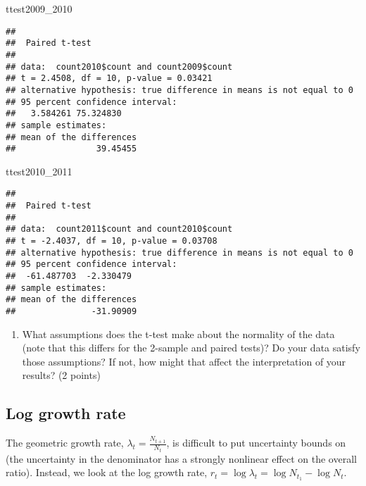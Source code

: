 \documentclass[
]{article}
\newenvironment{Shaded}{\begin{snugshade}}{\end{snugshade}}
\newcommand{\DecValTok}[1]{\textcolor[rgb]{0.00,0.00,0.81}{#1}}
\newcommand{\NormalTok}[1]{#1}
\providecommand{\tightlist}{%
  \setlength{\itemsep}{0pt}\setlength{\parskip}{0pt}}
\begin{document}
\begin{Shaded}
\begin{Highlighting}[]
\NormalTok{ttest2009_}\DecValTok{2010}
\end{Highlighting}
\end{Shaded}

\begin{verbatim}
## 
##  Paired t-test
## 
## data:  count2010$count and count2009$count
## t = 2.4508, df = 10, p-value = 0.03421
## alternative hypothesis: true difference in means is not equal to 0
## 95 percent confidence interval:
##   3.584261 75.324830
## sample estimates:
## mean of the differences 
##                39.45455
\end{verbatim}

\begin{Shaded}
\begin{Highlighting}[]
\NormalTok{ttest2010_}\DecValTok{2011}
\end{Highlighting}
\end{Shaded}

\begin{verbatim}
## 
##  Paired t-test
## 
## data:  count2011$count and count2010$count
## t = -2.4037, df = 10, p-value = 0.03708
## alternative hypothesis: true difference in means is not equal to 0
## 95 percent confidence interval:
##  -61.487703  -2.330479
## sample estimates:
## mean of the differences 
##               -31.90909
\end{verbatim}

\begin{enumerate}
\def\labelenumi{\arabic{enumi}.}
\setcounter{enumi}{5}
\tightlist
\item
  What assumptions does the t-test make about the normality of the data
  (note that this differs for the 2-sample and paired tests)? Do your
  data satisfy those assumptions? If not, how might that affect the
  interpretation of your results? (2 points)
\end{enumerate}

\hypertarget{log-growth-rate}{%
\subsection{Log growth rate}\label{log-growth-rate}}

The geometric growth rate, \(\lambda_t = \frac{N_{t+1}}{N_t}\), is
difficult to put uncertainty bounds on (the uncertainty in the
denominator has a strongly nonlinear effect on the overall ratio).
Instead, we look at the log growth rate,
\(r_t = \log \lambda_t = \log N_{t_1} - \log N_t\).
\end{document}
